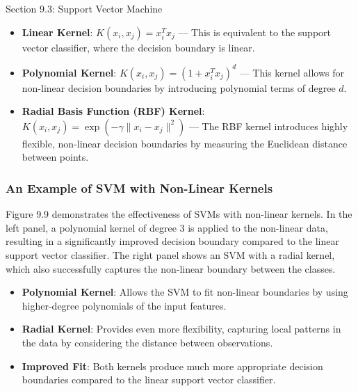 \begin{notes}{Section 9.3: Support Vector Machine}
    \begin{highlight}
        \begin{itemize}
            \item \textbf{Linear Kernel}: $K(x_i, x_j) = x_i^T x_j$ — This is equivalent to the support vector classifier, where the decision boundary is linear.
            \item \textbf{Polynomial Kernel}: $K(x_i, x_j) = (1 + x_i^T x_j)^d$ — This kernel allows for non-linear decision boundaries by introducing polynomial terms of degree $d$.
            \item \textbf{Radial Basis Function (RBF) Kernel}: $K(x_i, x_j) = \exp(-\gamma \| x_i - x_j \|^2)$ — The RBF kernel introduces highly flexible, non-linear decision boundaries by measuring the Euclidean distance between points.
        \end{itemize}
    \end{highlight}
    
    \subsubsection*{An Example of SVM with Non-Linear Kernels}
    
    Figure 9.9 demonstrates the effectiveness of SVMs with non-linear kernels. In the left panel, a polynomial kernel of degree 3 is applied to the non-linear data, resulting in a significantly improved 
    decision boundary compared to the linear support vector classifier. The right panel shows an SVM with a radial kernel, which also successfully captures the non-linear boundary between the classes.
    
    \begin{highlight}
        \begin{itemize}
            \item \textbf{Polynomial Kernel}: Allows the SVM to fit non-linear boundaries by using higher-degree polynomials of the input features.
            \item \textbf{Radial Kernel}: Provides even more flexibility, capturing local patterns in the data by considering the distance between observations.
            \item \textbf{Improved Fit}: Both kernels produce much more appropriate decision boundaries compared to the linear support vector classifier.
        \end{itemize}
    \end{highlight}
    

\end{notes}
